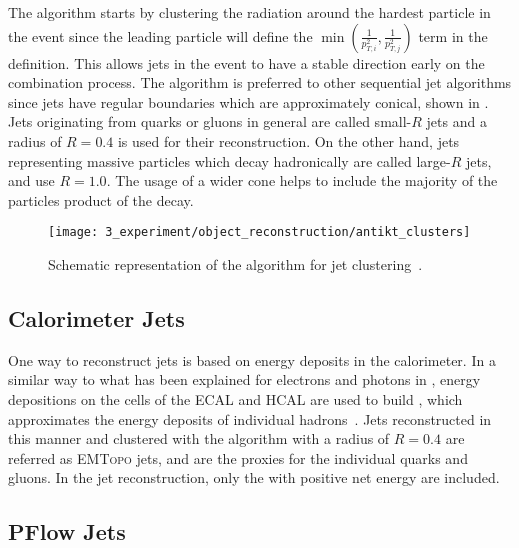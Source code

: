 The \antikt algorithm starts by clustering the radiation around the hardest particle in the event since the leading \pt particle will define the \(\min \left( \frac{1}{p_{T,i}^2}, \frac{1}{p_{T,j}^2}  \right)\) term in the \dij definition. This allows jets in the event to have a stable direction early on the combination process. The \antikt algorithm is preferred to other sequential jet algorithms since jets have regular boundaries which are approximately conical, shown in \Fig{\ref{fig:objects:jets:antikt}}. Jets originating from quarks or gluons in general are called small-\(R\) jets and a radius of \(R=0.4\) is used for their reconstruction. On the other hand, jets representing massive particles which decay hadronically are called large-\(R\) jets, and use \(R=1.0\). The usage of a wider cone helps to include the majority of the particles product of the decay.


\begin{figure}[ht!]
    \centering
    \texttt{[image: 3\_experiment/object\_reconstruction/antikt\_clusters]}
    \caption{Schematic representation of the \antikt algorithm for jet clustering~\cite{AntiKtAlgorithm}.}
    \label{fig:objects:jets:antikt}
\end{figure}

\subsection{Calorimeter Jets}

One way to reconstruct jets is based on energy deposits in the calorimeter. In a similar way to what has been explained for electrons and photons in \Sect{\ref{subsec:objects:egamma:reco}}, energy depositions on the cells of the \ac{ECAL} and \ac{HCAL} are used to build \topos, which approximates the energy deposits of individual hadrons~\cite{ATLASTopoClustersRun1,ATLASTopoClustersRun2}. Jets reconstructed in this manner and clustered with the \antikt algorithm with a radius of \(R=0.4\) are referred as \textsc{EMTopo} jets, and are the proxies for the individual quarks and gluons. In the jet reconstruction, only the \topos with positive net energy are included.

\subsection{PFlow Jets}

